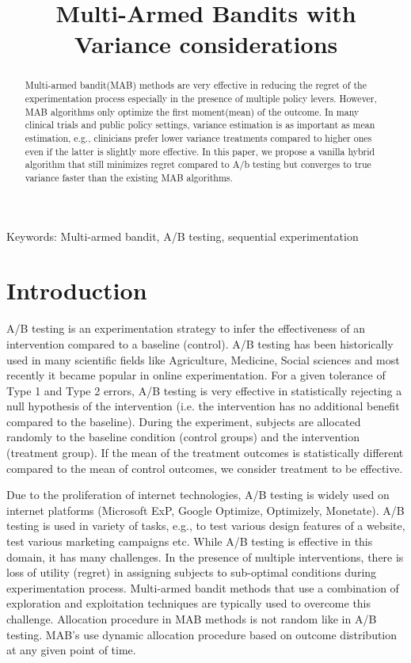 \documentclass[letterpaper,11pt]{article}
\title{Multi-Armed Bandits with Variance considerations}
\begin{document}
\maketitle
\doublespacing

\begin{abstract}
Multi-armed bandit(MAB) methods are very effective in reducing the regret of the experimentation process especially in the presence of multiple policy levers. However, MAB algorithms only optimize the first moment(mean) of the outcome. In many clinical trials and public policy settings, variance estimation is as important as mean estimation, e.g., clinicians prefer lower variance treatments compared to higher ones even if the latter is slightly more effective. In this paper, we propose a vanilla hybrid algorithm that still minimizes regret compared to A/b testing but converges to true variance faster than the existing MAB algorithms. 
\end{abstract}

{Keywords: Multi-armed bandit, A/B testing, sequential experimentation}

\section{Introduction}

A/B testing is an experimentation strategy to infer the effectiveness of an intervention compared to a baseline (control). A/B testing has been historically used in many scientific fields like Agriculture, Medicine, Social sciences and most recently it became popular in online experimentation. For a given tolerance of Type 1 and Type 2 errors, A/B testing is very effective in statistically rejecting a null hypothesis of the intervention (i.e. the intervention has no additional benefit compared to the baseline). During the experiment, subjects are allocated randomly to the baseline condition (control groups) and the intervention (treatment group). If the mean of the treatment outcomes is statistically different compared to the mean of control outcomes, we consider treatment to be effective.

Due to the proliferation of internet technologies, A/B testing is widely used on internet platforms (Microsoft ExP, Google Optimize, Optimizely, Monetate). A/B testing is used in variety of tasks, e.g., to test various design features of a website, test various marketing campaigns etc. While A/B testing is effective in this domain, it has many challenges. In the presence of multiple interventions, there is loss of utility (regret) in assigning subjects to sub-optimal conditions during experimentation process. Multi-armed bandit methods that use a combination of exploration and exploitation techniques are typically used to overcome this challenge. Allocation procedure in MAB methods is not random like in A/B testing. MAB's use dynamic allocation procedure based on outcome distribution at any given point of time. 
\end{document}
